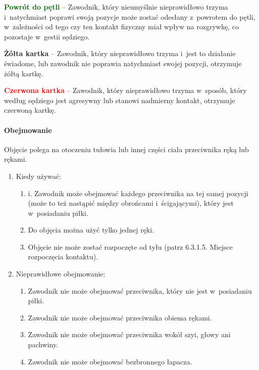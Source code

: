 \documentclass[12pt]{article}
\newcommand\redcard[1]{\bgroup\textcolor{red}{\textbf{#1}}}
\newcommand\yellowcard[1]{\bgroup\textcolor{darkyellow}{\textbf{#1}}}
\newcommand\other[1]{\bgroup\textcolor{darkgreen}{\textbf{#1}}}
\begin{document}
\other{Powrót do pętli} -- Zawodnik, który nieumyślnie nieprawidłowo
trzyma i~natychmiast poprawi swoją pozycje może zostać odesłany z~powrotem do pętli, w~zależności od tego czy ten kontakt fizyczny miał
wpływ na rozgrywkę, co pozostaje w~gestii sędziego.

\yellowcard{Żółta kartka} -- Zawodnik, który nieprawidłowo trzyma i~jest to
działanie świadome, lub zawodnik nie poprawia natychmiast swojej
pozycji, otrzymuje żółtą kartkę.

\redcard{Czerwona kartka} -- Zawodnik, który nieprawidłowo trzyma w~sposób,
który według sędziego jest agresywny lub stanowi nadmierny kontakt,
otrzymuje czerwoną kartkę.

\paragraph{Obejmowanie}
Objęcie polega na otoczeniu tułowia lub
innej części ciała przeciwnika ręką lub rękami.

\begin{enumerate}
	\item
	      Kiedy używać:

	      \begin{enumerate}
		      \item
		            i. Zawodnik może obejmować każdego przeciwnika na tej samej pozycji
		            (może to też nastąpić między obrońcami i~ścigającymi), który jest w~posiadaniu piłki.
		      \item
		            Do objęcia można użyć tylko jednej ręki.
		      \item
		            Objęcie nie może zostać rozpoczęte od tyłu (patrz 6.3.1.5. Miejsce
		            rozpoczęcia kontaktu).
	      \end{enumerate}
	\item
	      Nieprawidłowe obejmowanie:

	      \begin{enumerate}
		      \item Zawodnik nie może obejmować przeciwnika, który nie jest w~posiadaniu
		            piłki.
		      \item
		            Zawodnik nie może obejmować przeciwnika obiema rękami.
		      \item
		            Zawodnik nie może obejmować przeciwnika wokół szyi, głowy ani
		            pachwiny.
		      \item
		            Zawodnik nie może obejmować bezbronnego łapacza.
	      \end{enumerate}
\end{enumerate}
\end{document}

